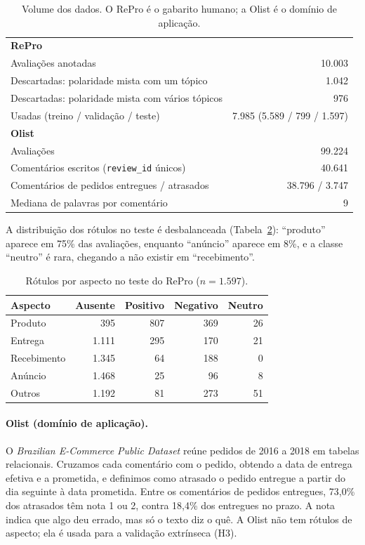 \documentclass[a4paper, twocolumn, 11pt, twoside]{article}
\begin{document}
\begin{table}[htb]
\centering
\small
\begin{tabular}{lr}
\toprule
\textbf{RePro} & \\
Avaliações anotadas & 10.003 \\
Descartadas: polaridade mista com um tópico & 1.042 \\
Descartadas: polaridade mista com vários tópicos & 976 \\
Usadas (treino / validação / teste) & 7.985 (5.589 / 799 / 1.597) \\
\midrule
\textbf{Olist} & \\
Avaliações & 99.224 \\
Comentários escritos (\texttt{review\_id} únicos) & 40.641 \\
Comentários de pedidos entregues / atrasados & 38.796 / 3.747 \\
Mediana de palavras por comentário & 9 \\
\bottomrule
\end{tabular}
\caption{Volume dos dados. O RePro é o gabarito humano; a Olist é o domínio de aplicação.}
\label{tab:dados}
\end{table}

A distribuição dos rótulos no teste é desbalanceada (Tabela~\ref{tab:dist}): ``produto'' aparece em 75\% das avaliações, enquanto ``anúncio'' aparece em 8\%, e a classe ``neutro'' é rara, chegando a não existir em ``recebimento''.

\begin{table}[htb]
\centering
\small
\setlength{\tabcolsep}{3.5pt}
\begin{tabular}{lrrrr}
\toprule
Aspecto & Ausente & Positivo & Negativo & Neutro \\
\midrule
Produto     &   395 & 807 & 369 & 26 \\
Entrega     & 1.111 & 295 & 170 & 21 \\
Recebimento & 1.345 &  64 & 188 &  0 \\
Anúncio     & 1.468 &  25 &  96 &  8 \\
Outros      & 1.192 &  81 & 273 & 51 \\
\bottomrule
\end{tabular}
\caption{Rótulos por aspecto no teste do RePro ($n = 1.597$).}
\label{tab:dist}
\end{table}

\paragraph{Olist (domínio de aplicação).} O \emph{Brazilian E-Commerce Public Dataset} \citep{olist2018} reúne pedidos de 2016 a 2018 em tabelas relacionais. Cruzamos cada comentário com o pedido, obtendo a data de entrega efetiva e a prometida, e definimos como atrasado o pedido entregue a partir do dia seguinte à data prometida. Entre os comentários de pedidos entregues, 73,0\% dos atrasados têm nota 1 ou 2, contra 18,4\% dos entregues no prazo. A nota indica que algo deu errado, mas só o texto diz o quê. A Olist não tem rótulos de aspecto; ela é usada para a validação extrínseca (H3).
\end{document}
